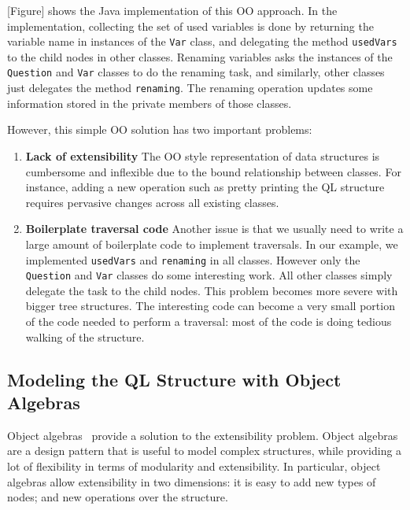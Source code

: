 [Figure] shows the Java implementation of this OO approach. In the implementation, collecting the set of used variables is done by returning the variable name in instances of the \lstinline{Var} class, and delegating the method \lstinline{usedVars} to the child nodes in other classes. Renaming variables asks the instances of the \lstinline{Question} and \lstinline{Var} classes to do the renaming task, and similarly, other classes just delegates the method \lstinline{renaming}. The renaming operation updates some information stored in the private members of those classes.

However, this simple OO solution has two important problems:

\begin{enumerate}

\item {\bf Lack of extensibility} The OO style
  representation of data structures is cumbersome and
  inflexible due to the bound relationship between classes. For
  instance, adding a new operation such as pretty
  printing the QL structure requires pervasive changes across all
  existing classes.

\item {\bf Boilerplate traversal code} Another issue is that we
  usually need to write a large amount of boilerplate code to
  implement traversals. In our example, we implemented
  \lstinline{usedVars} and \lstinline{renaming} in all
  classes. However only the \lstinline{Question} and \lstinline{Var} classes do some
  interesting work. All other classes simply delegate the task to the
  child nodes. This problem becomes more severe with bigger tree
  structures. The interesting code can become a very small portion of
  the code needed to perform a traversal: most of the code is doing
  tedious walking of the structure.

\end{enumerate}

\subsection{Modeling the QL Structure with Object Algebras}

Object algebras~\cite{bruno12oa} provide a solution to the extensibility problem.
Object algebras are a design pattern that is useful to model complex
structures, while providing a lot of flexibility in terms of
modularity and extensibility. In particular, object algebras allow
extensibility in two dimensions: it is easy to add new types of
nodes; and new operations over the structure.

